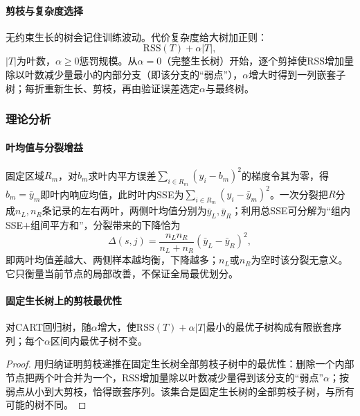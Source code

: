 \paragraph{剪枝与复杂度选择}

无约束生长的树会记住训练波动。代价复杂度给大树加正则：
\begin{equation}
  \mathrm{RSS}(T)+\alpha|T|,
  \label{eq:regression-pruning}
\end{equation}
$|T|$为叶数，$\alpha\geq0$惩罚规模。从$\alpha=0$（完整生长树）开始，逐个剪掉使RSS增加量除以叶数减少量最小的内部分支（即该分支的“弱点”），$\alpha$增大时得到一列嵌套子树；每折重新生长、剪枝，再由验证误差选定$\alpha$与最终树。

\subsubsection{理论分析}
\label{sec:regression-cart-theory}

\paragraph{叶均值与分裂增益}

固定区域$R_m$，对$b_m$求叶内平方误差$\sum_{i\in R_m}(y_i-b_m)^2$的梯度令其为零，得$b_m=\bar y_m$即叶内响应均值，此时叶内SSE为$\sum_{i\in R_m}(y_i-\bar y_m)^2$。一次分裂把$R$分成$n_L,n_R$条记录的左右两叶，两侧叶均值分别为$\bar y_L,\bar y_R$；利用总SSE可分解为“组内SSE$+$组间平方和”，分裂带来的下降恰为
\[
  \Delta(s,j)=\frac{n_L n_R}{n_L+n_R}(\bar y_L-\bar y_R)^2,
\]
即两叶均值差越大、两侧样本越均衡，下降越多；$n_L$或$n_R$为空时该分裂无意义。它只衡量当前节点的局部改善，不保证全局最优划分。

\paragraph{固定生长树上的剪枝最优性}

\begin{theorem}[代价复杂度子树序列]
\label{thm:regression-pruning}
对CART回归树，随$\alpha$增大，使$\mathrm{RSS}(T)+\alpha|T|$最小的最优子树构成有限嵌套序列；每个$\alpha$区间内最优子树不变。
\end{theorem}

\begin{proof}
用归纳证明剪枝递推在固定生长树全部剪枝子树中的最优性：删除一个内部节点把两个叶合并为一个，RSS增加量除以叶数减少量得到该分支的“弱点”$\alpha$；按弱点从小到大剪枝，恰得嵌套序列。该集合是固定生长树的全部剪枝子树，与所有可能的树不同。
\end{proof}

